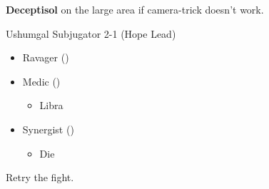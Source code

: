 \documentclass{report}
\begin{document}
\textbf{Deceptisol} on the large area if camera-trick doesn't work.
\renewcommand{\first}{[1] Ravager (\rav)}
\renewcommand{\second}{[2] Medic (\med)}
\renewcommand{\third}{[3] Synergist (\syn)}
\begin{battle}{Ushumgal Subjugator 2-1 (Hope Lead)}
\begin{itemize}
    \item \first
    \item \second
    \begin{itemize}
        \item Libra
    \end{itemize}
    \item \third
    \begin{itemize}
        \item Die
    \end{itemize}
\end{itemize}
\end{battle}
Retry the fight.
\end{document}
